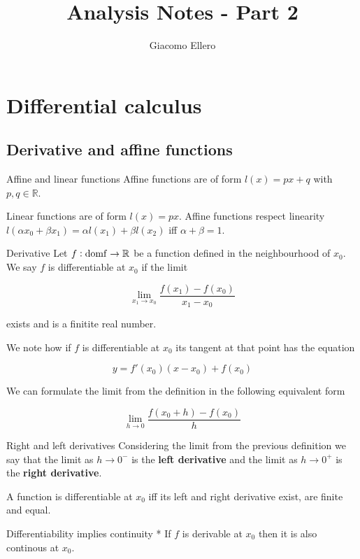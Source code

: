 \documentclass[17pt]{extarticle}
\title{Analysis Notes - Part 2}
\author{Giacomo Ellero}
\newcommand{\R}{\mathbb{R}}
\begin{document}
\maketitle
\tableofcontents
\clearpage

\section {Differential calculus}
\subsection{Derivative and affine functions}


\begin{statement}[Definition]{Affine and linear functions}
  Affine functions are of form $l(x) = px + q$ with $p, q \in \R$.
\end{statement}

Linear functions are of form $l(x) = px$.
Affine functions respect linearity $l(\alpha x_0 + \beta x_1) = \alpha l(x_1) + \beta l(x_2)$
iff $\alpha + \beta = 1$.

\begin{statement}[Definition]{Derivative}
  Let $f: \operatorfont{dom} f \to \R$ be a function defined in the neighbourhood of $x_0$.
  We say $f$ is differentiable at $x_0$ if the limit

  $$
    \lim_{x_1 \to x_0} \frac{f(x_1) - f(x_0)}{x_1 - x_0}
  $$

  exists and is a finitite real number.
\end{statement}

We note how if $f$ is differentiable at $x_0$ its tangent at that point has the equation

$$
  y = f'(x_0)(x-x_0) + f(x_0)
$$

We can formulate the limit from the definition in the following equivalent form

$$
  \lim_{h \to 0} \frac{f(x_0 + h) - f(x_0)}{h}
$$

\begin{statement}{Right and left derivatives}
  Considering the limit from the previous definition we say that
  the limit as $h \to 0^-$ is the \textbf{left derivative}
  and the limit as $h \to 0^+$ is the \textbf{right derivative}.

  A function is differentiable at $x_0$ iff its left and right derivative exist, are finite and equal.
\end{statement}

\begin{statement}{Differentiability implies continuity *}
  If $f$ is derivable at $x_0$ then it is also continous at $x_0$.
\end{statement}
\end{document}
